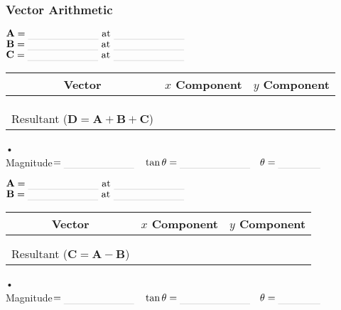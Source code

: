 \documentclass[main.tex]{subfiles}
\begin{document}
\begin{doublespace}
\newpage
\subsubsection*{Vector Arithmetic}

\begin{centering}
$\mathbf{A}=\rule[-1mm]{2.5cm}{.1pt}\text{ at }\rule[-1mm]{2.5cm}{.1pt}$\\
$\mathbf{B}=\rule[-1mm]{2.5cm}{.1pt}\text{ at }\rule[-1mm]{2.5cm}{.1pt}$\\
$\mathbf{C}=\rule[-1mm]{2.5cm}{.1pt}\text{ at }\rule[-1mm]{2.5cm}{.1pt}$\\
\end{centering}\vspace{10pt}

\begin{tabular}{|c|c|c|}
\hline
Vector & $x$ Component & $y$ Component\\
\hline
&&\\
\hline
&&\\
\hline
&&\\
\hline
Resultant ($\mathbf{D}=\mathbf{A}+\mathbf{B}+\mathbf{C}$) &&\\
\hline
\end{tabular}•\\

Magnitude$=\rule[-1mm]{2.5cm}{.1pt} \quad  \tan\theta=\rule[-1mm]{2.5cm}{.1pt} \quad \theta=\rule[-1mm]{1.5cm}{.1pt}$\\

\begin{centering}
$\mathbf{A}=\rule[-1mm]{2.5cm}{.1pt}\text{ at }\rule[-1mm]{2.5cm}{.1pt}$\\
$\mathbf{B}=\rule[-1mm]{2.5cm}{.1pt}\text{ at }\rule[-1mm]{2.5cm}{.1pt}$\\
\end{centering}\vspace{10pt}

\begin{tabular}{|c|c|c|}
\hline
Vector & $x$ Component & $y$ Component\\
\hline
&&\\
\hline
&&\\
\hline
Resultant ($\mathbf{C}=\mathbf{A}-\mathbf{B}$) &&\\
\hline
\end{tabular}•\\ 

Magnitude$=\rule[-1mm]{2.5cm}{.1pt} \quad  \tan\theta=\rule[-1mm]{2.5cm}{.1pt} \quad \theta=\rule[-1mm]{1.5cm}{.1pt}$\\


\end{doublespace}
\end{document}
